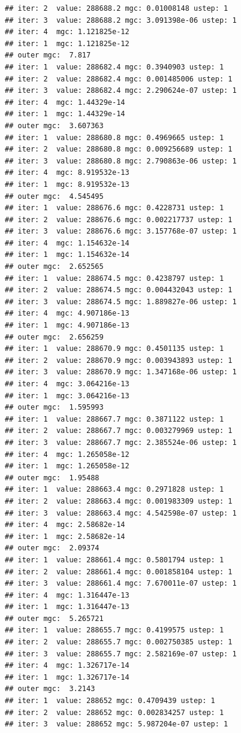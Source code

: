 \documentclass{article}\usepackage[]{graphicx}\usepackage[]{xcolor}
\makeatletter
\newenvironment{kframe}{%
 \def\at@end@of@kframe{}%
 \ifinner\ifhmode%
  \def\at@end@of@kframe{\end{minipage}}%
  \begin{minipage}{\columnwidth}%
 \fi\fi%
 \def\FrameCommand##1{\hskip\@totalleftmargin \hskip-\fboxsep
 \colorbox{shadecolor}{##1}\hskip-\fboxsep
     \hskip-\linewidth \hskip-\@totalleftmargin \hskip\columnwidth}%
 \MakeFramed {\advance\hsize-\width
   \@totalleftmargin\z@ \linewidth\hsize
   \@setminipage}}%
 {\par\unskip\endMakeFramed%
 \at@end@of@kframe}
\newenvironment{knitrout}{}{} %
\makeatother
\begin{document}
\begin{knitrout}
\begin{kframe}
\begin{verbatim}
## iter: 2  value: 288688.2 mgc: 0.01008148 ustep: 1 
## iter: 3  value: 288688.2 mgc: 3.091398e-06 ustep: 1 
## iter: 4  mgc: 1.121825e-12 
## iter: 1  mgc: 1.121825e-12 
## outer mgc:  7.817 
## iter: 1  value: 288682.4 mgc: 0.3940903 ustep: 1 
## iter: 2  value: 288682.4 mgc: 0.001485006 ustep: 1 
## iter: 3  value: 288682.4 mgc: 2.290624e-07 ustep: 1 
## iter: 4  mgc: 1.44329e-14 
## iter: 1  mgc: 1.44329e-14 
## outer mgc:  3.607363 
## iter: 1  value: 288680.8 mgc: 0.4969665 ustep: 1 
## iter: 2  value: 288680.8 mgc: 0.009256689 ustep: 1 
## iter: 3  value: 288680.8 mgc: 2.790863e-06 ustep: 1 
## iter: 4  mgc: 8.919532e-13 
## iter: 1  mgc: 8.919532e-13 
## outer mgc:  4.545495 
## iter: 1  value: 288676.6 mgc: 0.4228731 ustep: 1 
## iter: 2  value: 288676.6 mgc: 0.002217737 ustep: 1 
## iter: 3  value: 288676.6 mgc: 3.157768e-07 ustep: 1 
## iter: 4  mgc: 1.154632e-14 
## iter: 1  mgc: 1.154632e-14 
## outer mgc:  2.652565 
## iter: 1  value: 288674.5 mgc: 0.4238797 ustep: 1 
## iter: 2  value: 288674.5 mgc: 0.004432043 ustep: 1 
## iter: 3  value: 288674.5 mgc: 1.889827e-06 ustep: 1 
## iter: 4  mgc: 4.907186e-13 
## iter: 1  mgc: 4.907186e-13 
## outer mgc:  2.656259 
## iter: 1  value: 288670.9 mgc: 0.4501135 ustep: 1 
## iter: 2  value: 288670.9 mgc: 0.003943893 ustep: 1 
## iter: 3  value: 288670.9 mgc: 1.347168e-06 ustep: 1 
## iter: 4  mgc: 3.064216e-13 
## iter: 1  mgc: 3.064216e-13 
## outer mgc:  1.595993 
## iter: 1  value: 288667.7 mgc: 0.3871122 ustep: 1 
## iter: 2  value: 288667.7 mgc: 0.003279969 ustep: 1 
## iter: 3  value: 288667.7 mgc: 2.385524e-06 ustep: 1 
## iter: 4  mgc: 1.265058e-12 
## iter: 1  mgc: 1.265058e-12 
## outer mgc:  1.95488 
## iter: 1  value: 288663.4 mgc: 0.2971828 ustep: 1 
## iter: 2  value: 288663.4 mgc: 0.001983309 ustep: 1 
## iter: 3  value: 288663.4 mgc: 4.542598e-07 ustep: 1 
## iter: 4  mgc: 2.58682e-14 
## iter: 1  mgc: 2.58682e-14 
## outer mgc:  2.09374 
## iter: 1  value: 288661.4 mgc: 0.5801794 ustep: 1 
## iter: 2  value: 288661.4 mgc: 0.001858104 ustep: 1 
## iter: 3  value: 288661.4 mgc: 7.670011e-07 ustep: 1 
## iter: 4  mgc: 1.316447e-13 
## iter: 1  mgc: 1.316447e-13 
## outer mgc:  5.265721 
## iter: 1  value: 288655.7 mgc: 0.4199575 ustep: 1 
## iter: 2  value: 288655.7 mgc: 0.002750385 ustep: 1 
## iter: 3  value: 288655.7 mgc: 2.582169e-07 ustep: 1 
## iter: 4  mgc: 1.326717e-14 
## iter: 1  mgc: 1.326717e-14 
## outer mgc:  3.2143 
## iter: 1  value: 288652 mgc: 0.4709439 ustep: 1 
## iter: 2  value: 288652 mgc: 0.002834257 ustep: 1 
## iter: 3  value: 288652 mgc: 5.987204e-07 ustep: 1 

\end{verbatim}
\end{kframe}
\end{knitrout}
\end{document}
